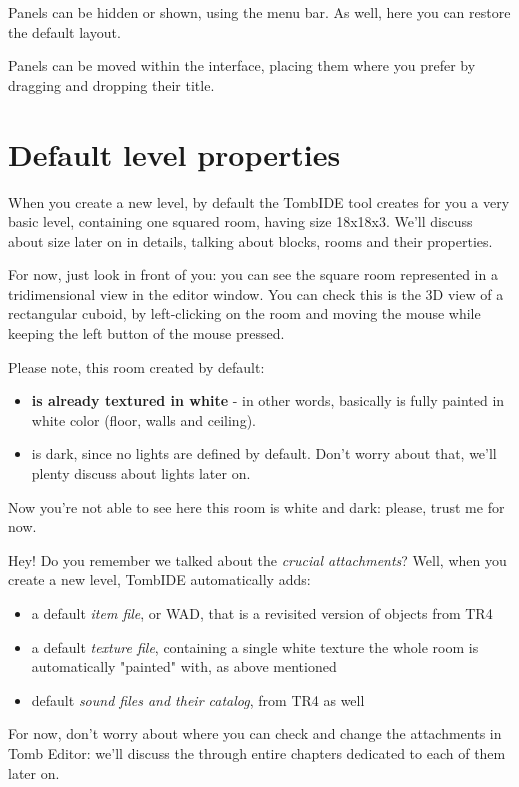 Panels can be hidden or shown, using the  menu bar. As well, here you can restore the default layout.
\par Panels can be moved within the interface, placing them where you prefer by dragging and dropping their title.

\section{Default level properties}
When you create a new level, by default the TombIDE tool creates for you a very basic level, containing one squared room, having size 18x18x3.
We'll discuss about size later on in details, talking about blocks, rooms and their properties.
\par For now, just look in front of you: you can see the square room represented in a tridimensional view in the editor window. You can check this is the 3D view of a rectangular cuboid, by left-clicking on the room and moving the mouse while keeping the left button of the mouse pressed.
\par Please note, this room created by default:
\begin{itemize}
    \item \textbf{is already textured in white} - in other words, basically is fully painted in white color (floor, walls and ceiling).
    \item is dark, since no lights are defined by default. Don't worry about that, we'll plenty discuss about lights later on.
\end{itemize}
Now you're not able to see here this room is white and dark: please, trust me for now.
\par Hey! Do you remember we talked about the \emph{crucial attachments}? Well, when you create a new level, TombIDE automatically adds:
\begin{itemize}
    \item a default \emph{item file}, or WAD, that is a revisited version of objects from TR4
    \item a default \emph{texture file}, containing a single white texture the whole room is automatically "painted" with, as above mentioned
    \item default \emph{sound files and their catalog}, from TR4 as well
\end{itemize}
For now, don't worry about where you can check and change the attachments in Tomb Editor: we'll discuss the through entire chapters dedicated to each of them later on.

